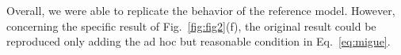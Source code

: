 
Overall, we were able to replicate the behavior of the reference model. However, concerning the specific result of Fig.~\ref{fig:fig2}(f), the original result could be reproduced only adding the ad hoc but reasonable condition in Eq.~\ref{eq:migue}.


